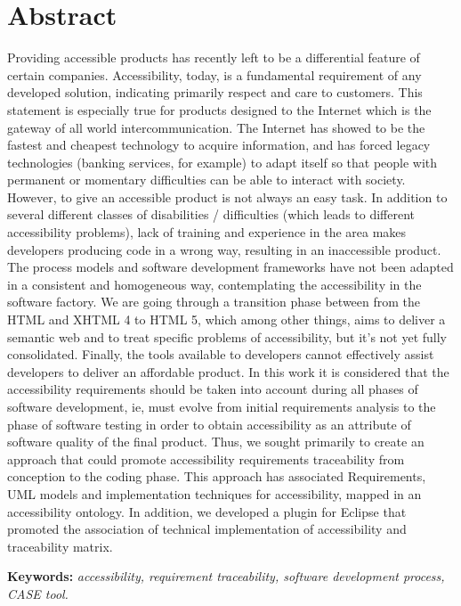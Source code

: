 \chapter*{Abstract}

Providing accessible products has recently left  to be a differential
feature of certain companies. Accessibility, today, is a fundamental requirement
of any developed solution, indicating primarily respect and care to
customers.
This statement is especially true for products designed to the Internet which is
the gateway of all  world intercommunication. The Internet has showed to be the
fastest and cheapest technology to acquire information, and has forced legacy
technologies (banking services, for example) to adapt itself so that people with
permanent or momentary difficulties can be able to interact with society.
However, to give an accessible product is not always an easy task. In addition to several different classes of disabilities / difficulties (which leads to
different accessibility problems), lack of training and experience in the area
makes developers producing code in a wrong way, resulting in an inaccessible
product.
The process models and software development frameworks have not been adapted in a
consistent and homogeneous way, contemplating the accessibility in the software
factory. We are going through a transition phase between from the HTML and
XHTML 4 to HTML 5, which among other things, aims to deliver a semantic web and
to treat specific problems of accessibility, but it's not yet fully
consolidated.
Finally, the tools available to developers cannot effectively assist developers to
deliver an affordable product. In this work it is considered that the accessibility requirements should be taken into account during all phases of software development, ie, must evolve from initial requirements analysis to the phase of software testing in order to obtain accessibility as an attribute of software quality of the final product. Thus, we sought primarily to create an approach that could promote accessibility requirements traceability from conception to the coding phase. This approach has associated Requirements, UML models and implementation techniques for accessibility, mapped in an accessibility ontology. In addition, we developed a plugin for Eclipse that promoted the association of technical implementation of accessibility and traceability matrix.

\textbf{Keywords:} \textit{accessibility, requirement traceability,
software development process, CASE tool.}

\label{abstract}